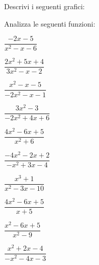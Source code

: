 \begin{esercizio}\label{ese:03.1}
Descrivi i seguenti grafici:

\begin{multicols}{2}
 \begin{enumeratea}
  \item \grafesea
  \item \grafeseb 
  \item \grafesec
  \item \grafesed 
  \item \grafesee
  \item \grafesef
  \item \grafeseg
  \item \grafeseh
  \item \grafesei
  \item \grafesej
 \end{enumeratea}
\end{multicols}
\end{esercizio}

\begin{esercizio}\label{ese:03.1}
Analizza le seguenti funzioni:
\begin{multicols}{2}
 \begin{enumeratea}
  \item \(\dfrac{-2x-5}{x^2-x-6}\)
  \item \(\dfrac{2x^2+5x+4}{3x^2-x-2}\) 
  \item \(\dfrac{x^2-x-5}{-2x^2-x-1}\) 
  \item \(\dfrac{3x^2 -3}{-2x^2 +4x +6}\) 
  \item \(\dfrac{4x^2 -6x +5}{x^2 +6}\) 
  \item \(\dfrac{-4x^2-2x+2}{-x^2+3x-4}\) 
  \item \(\dfrac{x^3 +1}{x^2 -3x -10}\) 
  \item \(\dfrac{4x^2 -6x +5}{x +5}\) 
  \item \(\dfrac{x^2 -6x +5}{x^2 -9}\) 
  \item \(\dfrac{x^2+2x-4}{-x^2-4x-3}\) 
 \end{enumeratea}
\end{multicols}
\end{esercizio}

\begin{comment}
 
\begin{esercizio}
\label{ese:}
\end{esercizio}

\end{comment}
